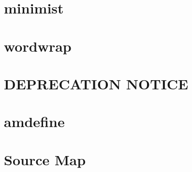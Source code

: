 \documentclass[twoside]{book}
\newcommand{\+}{\discretionary{\mbox{\scriptsize$\hookleftarrow$}}{}{}}
\begin{document}
\chapter{minimist}
\label{md__c_1__users_martin__documents__git_hub_visual_studio__bachelor__wis_r__wis_r_node_modules_ist7ef161c00de7bb8bc5ab59996dc1357d}
\hypertarget{md__c_1__users_martin__documents__git_hub_visual_studio__bachelor__wis_r__wis_r_node_modules_ist7ef161c00de7bb8bc5ab59996dc1357d}{}

\chapter{wordwrap}
\label{md__c_1__users_martin__documents__git_hub_visual_studio__bachelor__wis_r__wis_r_node_modules_ist61e0cb161e79586b4c3d69cecd163076}
\hypertarget{md__c_1__users_martin__documents__git_hub_visual_studio__bachelor__wis_r__wis_r_node_modules_ist61e0cb161e79586b4c3d69cecd163076}{}

\chapter{D\+E\+P\+R\+E\+C\+A\+T\+I\+O\+N N\+O\+T\+I\+C\+E}
\label{md__c_1__users_martin__documents__git_hub_visual_studio__bachelor__wis_r__wis_r_node_modules_ist7a25a6afb48f18f0bb8da11367cad9ec}
\hypertarget{md__c_1__users_martin__documents__git_hub_visual_studio__bachelor__wis_r__wis_r_node_modules_ist7a25a6afb48f18f0bb8da11367cad9ec}{}

\chapter{amdefine}
\label{md__c_1__users_martin__documents__git_hub_visual_studio__bachelor__wis_r__wis_r_node_modules_ist91afbf6ad8eb67166df01e865b0afcd0}
\hypertarget{md__c_1__users_martin__documents__git_hub_visual_studio__bachelor__wis_r__wis_r_node_modules_ist91afbf6ad8eb67166df01e865b0afcd0}{}

\chapter{Source Map}
\label{md__c_1__users_martin__documents__git_hub_visual_studio__bachelor__wis_r__wis_r_node_modules_ist368bdc9d8fada5bb374d62da38100c26}
\hypertarget{md__c_1__users_martin__documents__git_hub_visual_studio__bachelor__wis_r__wis_r_node_modules_ist368bdc9d8fada5bb374d62da38100c26}{}

\end{document}
